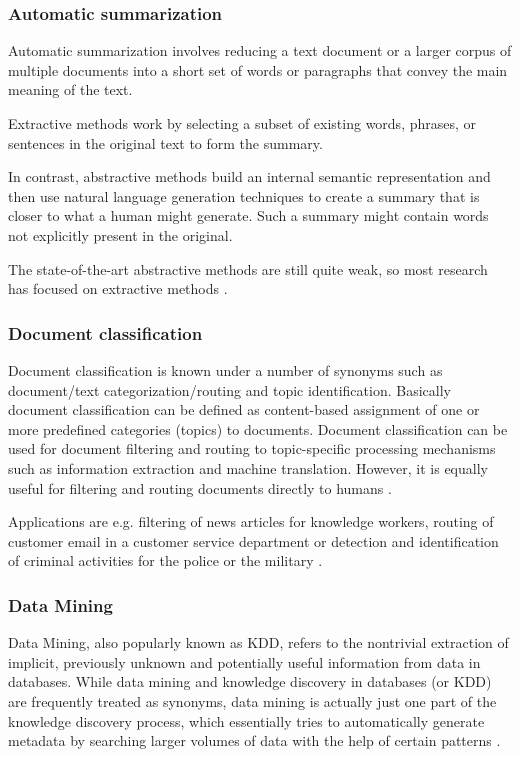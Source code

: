 \subsubsection{Automatic summarization}
Automatic summarization involves reducing a text document or a larger corpus of multiple documents into a short set of words or paragraphs that convey the main meaning of the text.

Extractive methods work by selecting a subset of existing words, phrases, or sentences in the original text to form the summary.

In contrast, abstractive methods build an internal semantic representation and then use natural language generation techniques to create a summary that is closer to what a human might generate. Such a summary might contain words not explicitly present in the original.

The state-of-the-art abstractive methods are still quite weak, so most research has focused on extractive methods \cite{Goldberg:2007}. 

\subsubsection{Document classification}
Document classification is known under a number of synonyms such as document/text categorization/routing and topic identification. Basically document classification can be defined as content-based assignment of one or more predefined categories (topics) to documents. Document classification can be used for document filtering and routing to topic-specific processing mechanisms such as information extraction and machine translation. However, it is equally useful for filtering and routing documents directly to humans \cite{Knorz:2000}.

Applications are e.g. filtering of news articles for knowledge workers, routing of customer email in a customer service department or detection and identification of criminal activities for the police or the military \cite{Knorz:2000}.

\subsubsection{Data Mining}
Data Mining, also popularly known as \gls{KDD}, refers to the nontrivial extraction of implicit, previously unknown and potentially useful information from data in databases. While data mining and knowledge discovery in databases (or KDD) are frequently treated as synonyms, data mining is actually just one part of the knowledge discovery process, which essentially tries to automatically generate metadata by searching larger volumes of data with the help of certain patterns \cite{Zaiane:1999}. 

